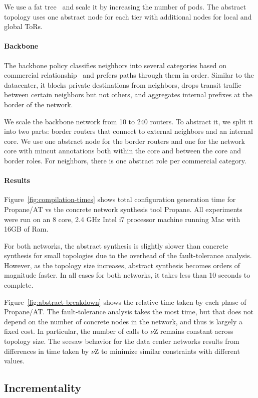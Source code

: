 \documentclass[numbers, 10pt, preprint]{sigplanconf}
\newcommand{\sysname}{{\text{}\small \sf Propane/AT}\xspace}
\newcommand{\Propane}{{\text{}\small \sf Propane}\xspace}
\newcommand{\para}[1]{\paragraph*{\textbf{#1}}}
\begin{document}
We use a fat tree~\cite{fattree} and scale it by increasing the number of pods. The abstract topology uses one abstract node for each tier with additional nodes for local and global ToRs.



\para{Backbone}

The backbone policy classifies neighbors into several categories based on commercial relationship~\cite{gao-rexford} and prefers paths through them in order. Similar to the datacenter, it blocks private destinations from neighbors, drops transit traffic between certain neighbors but not others, and aggregates internal prefixes at the border of the network.

We scale the backbone network from 10 to 240 routers. To abstract it, we split it into two parts: border routers that connect to external neighbors and an internal core. We use one abstract node for the border routers and one for the network core with mincut annotations both within the core and between the core and border roles. For neighbors, there is one abstract role per commercial category.

\para{Results}

Figure~\ref{fig:compilation-times} shows total configuration generation time for \sysname vs the concrete network synthesis tool \Propane. All experiments were run on an 8 core, 2.4 GHz Intel i7 processor machine running Mac with 16GB of Ram.

For both networks, the abstract synthesis is slightly slower than concrete synthesis for small topologies due to the overhead of the fault-tolerance analysis. However, as the topology size increases, abstract synthesis becomes orders of magnitude faster. In all cases for both networks, it takes less than 10 seconds to complete.

Figure~\ref{fig:abstract-breakdown} shows the relative time taken by each phase of \sysname. The fault-tolerance analysis takes the most time, but that does not depend on the number of concrete nodes in the network, and thus is largely a fixed cost. In particular, the number of calls to $\nu$Z remains constant across topology size. The seesaw behavior for the data center networks results from differences in time taken by $\nu$Z to minimize similar constraints with different values.

\subsection{Incrementality}
\label{sec:incrementality}
\end{document}
